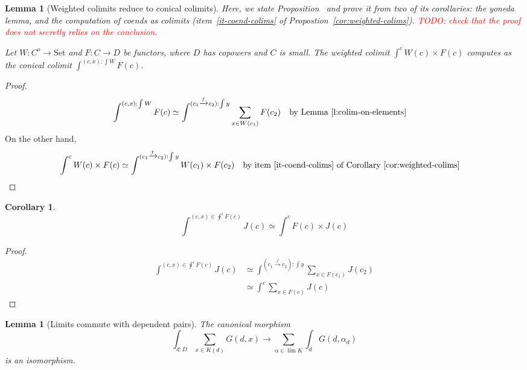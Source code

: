 \documentclass{article}
\newcommand{\Set}{\text{Set}}
\newtheorem{corollary}[theorem]{Corollary}
\newtheorem{lemma}[theorem]{Lemma}
\begin{document}
\begin{lemma}[Weighted colimits reduce to conical colimits]
\label{l:weighted-colims}
  Here, we state Proposition~\label{p:weighted-colims} and prove it from two of
  its corollaries: the yoneda lemma, and the computation of coends as colimits
  (item~\ref{it-coend-colims} of Propostion~\ref{cor:weighted-colims}).
  \textcolor{red}{TODO: check that the proof does not secretly relies on the conclusion.}
  
  Let $W : C^o \rightarrow \Set$ and $F : C\rightarrow D$ be functors, where $D$ has copowers and
  $C$ is small.
  The weighted colimit $\int^c W(c)\times F(c)$ computes as the conical colimit
  $\int^{(c,x):\int W} F(c)$.
\end{lemma}
\begin{proof}
  \begin{align*}
    \int^{(c,x):\int W} F(c)
    & \simeq
      \int^{(c_1\xrightarrow{f} c_2):  \int y}
      \sum_{x\in W(c_1)}
      F(c_2) \text{\quad by Lemma~\ref{l:colim-on-elements}}
  \end{align*}
  On the other hand,
  \begin{align*}
    \int^c W(c)\times F(c)
    & \simeq
      \int^{(c_1\xrightarrow{f} c_2):  \int y}
      W(c_1)\times
      F(c_2) \text{\quad by item~\ref{it-coend-colims} of Corollary~\ref{cor:weighted-colims}}
  \end{align*}
\end{proof}
\begin{corollary}
  \[
 \int^{(c,x)\in \oint^c F(c)} J(c) \simeq \int^c F(c)\times J(c) 
\]
\end{corollary}
\begin{proof}
  \begin{align*}
    \int^{(c,x)\in \oint^c F(c)} J(c) 
    & \simeq
      \int^{(c_1\xrightarrow{f}{} c_2):  \int y}
      \sum_{x\in F(c_1)} J(c_2)
      \\
    & \simeq
      \int^{c}
      \sum_{x\in F(c)} J(c)
  \end{align*}
\end{proof}
\begin{lemma}[Limits commute with dependent pairs]
  \label{l:lim-dep-pairs}
  The canonical morphism \[
    \int_{d:D} \sum_{x\in K(d)} G(d,x) \rightarrow
    \sum_{\alpha\in \lim K}\int_d G(d,\alpha_d)
  \] 
  is an isomorphism.
\end{lemma}
\end{document}
